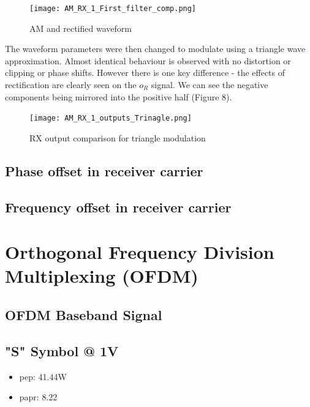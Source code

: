 \documentclass[a4paper]{article}
\begin{document}
\begin{figure}[htbp]
\centering

\texttt{[image: AM\_RX\_1\_First\_filter\_comp.png]}
\caption{AM and rectified waveform}

\end{figure}

\newpage

\noindent The waveform parameters were then changed to modulate using a triangle wave approximation. Almost identical behaviour is observed with no distortion or clipping or phase shifts. However there is one key difference - the effects of rectification are clearly seen on the $o_R$ signal. We can see the negative components being mirrored into the positive half (Figure 8).

\begin{figure}[htbp]
\centering

\texttt{[image: AM\_RX\_1\_outputs\_Trinagle.png]}
\caption{RX output comparison for triangle modulation}

\end{figure}

\newpage



\subsection*{Phase offset in receiver carrier}

\subsection*{Frequency offset in receiver carrier}

\section{Orthogonal Frequency Division Multiplexing (OFDM)}
\subsection{OFDM Baseband Signal}
\subsection*{"S" Symbol @ 1V}
\begin{itemize}
    \item \gls{pep}: 41.44W
    \item \gls{papr}: 8.22
\end{itemize}
\end{document}
